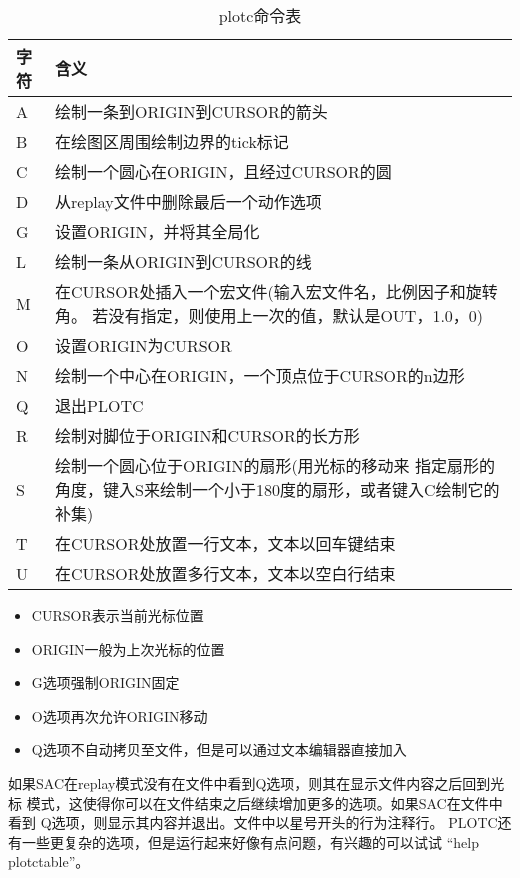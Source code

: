 \begin{table}[!ht]
\centering
\ttfamily
\small
\caption{plotc命令表}
\begin{tabular}{p{1cm}p{10cm}}
	\toprule
	字符	& 	含义	\\
	\midrule
	A		&	绘制一条到ORIGIN到CURSOR的箭头	\\
	B		&	在绘图区周围绘制边界的tick标记  \\
	C		&	绘制一个圆心在ORIGIN，且经过CURSOR的圆	\\
	D		&	从replay文件中删除最后一个动作选项	\\
	G		&	设置ORIGIN，并将其全局化	\\
	L		& 	绘制一条从ORIGIN到CURSOR的线	\\
	M		&	在CURSOR处插入一个宏文件(输入宏文件名，比例因子和旋转角。
                若没有指定，则使用上一次的值，默认是OUT，1.0，0)\\
	O		&	设置ORIGIN为CURSOR		\\
	N		&	绘制一个中心在ORIGIN，一个顶点位于CURSOR的n边形 \\
	Q		&	退出PLOTC	\\
	R		&	绘制对脚位于ORIGIN和CURSOR的长方形	\\
	S		&	绘制一个圆心位于ORIGIN的扇形(用光标的移动来
                指定扇形的角度，键入S来绘制一个小于180度的扇形，或者键入C绘制它的补集)\\
	T		&	在CURSOR处放置一行文本，文本以回车键结束	\\
	U		&	在CURSOR处放置多行文本，文本以空白行结束	\\
	\bottomrule
\end{tabular}
\end{table}
\begin{itemize}
\item CURSOR表示当前光标位置
\item ORIGIN一般为上次光标的位置
\item G选项强制ORIGIN固定
\item O选项再次允许ORIGIN移动
\item Q选项不自动拷贝至文件，但是可以通过文本编辑器直接加入
\end{itemize}
如果SAC在replay模式没有在文件中看到Q选项，则其在显示文件内容之后回到光标
模式，这使得你可以在文件结束之后继续增加更多的选项。如果SAC在文件中看到
Q选项，则显示其内容并退出。文件中以星号开头的行为注释行。
PLOTC还有一些更复杂的选项，但是运行起来好像有点问题，有兴趣的可以试试
``help plotctable''。
